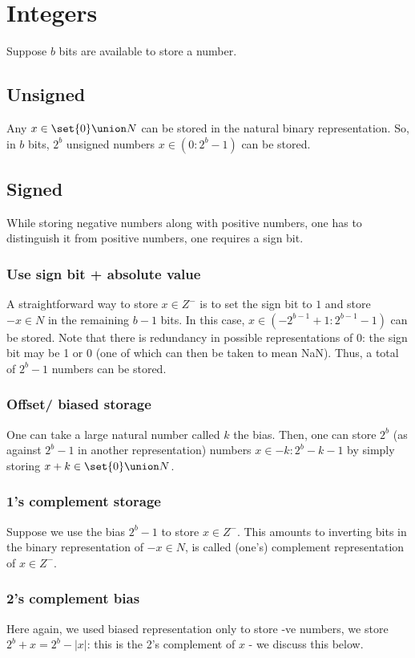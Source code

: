 \documentclass[oneside, article]{memoir}
\begin{document}
\section{Integers}
Suppose $b$ bits are available to store a number.

\subsection{Unsigned}
Any $x \in \set{0} \union N$ can be stored in the natural binary representation. So, in $b$ bits, $2^b$ unsigned numbers $x \in (0: 2^{b} -1 )$ can be stored.

\subsection{Signed}
While storing negative numbers along with positive numbers, one has to distinguish it from positive numbers, one requires a sign bit.

\subsubsection{Use sign bit + absolute value}
A straightforward way to store $x \in Z^{-}$ is to set the sign bit to $1$ and store $-x \in N$ in the remaining $b-1$ bits. In this case, $x \in (-2^{b-1}+1: 2^{b-1}-1)$ can be stored. Note that there is redundancy in possible representations of 0: the sign bit may be 1 or 0 (one of which can then be taken to mean NaN). Thus, a total of $2^{b}-1$ numbers can be stored.

\subsubsection{Offset/ biased storage}
One can take a large natural number called $k$ the bias. Then, one can store $2^b$ (as against $2^b -1$ in another representation) numbers $x \in -k:2^b - k-1$ by simply storing $x + k \in \set{0} \union N$.

\subsubsection{1's complement storage}
Suppose we use the bias $2^{b} - 1$ to store $x \in Z^-$. This amounts to inverting bits in the binary representation of $-x \in N$, is called (one's) complement representation of $x \in Z^-$.

\subsubsection{2's complement bias}
Here again, we used biased representation only to store -ve numbers, we store $2^{b} + x = 2^{b} - |x|$: this is the 2's complement of $x$ - we discuss this below.
\end{document}

